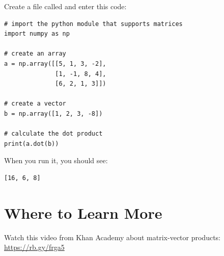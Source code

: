 Create a file called  and enter this code:

\begin{verbatim}
# import the python module that supports matrices
import numpy as np

# create an array
a = np.array([[5, 1, 3, -2], 
              [1, -1, 8, 4], 
              [6, 2, 1, 3]])

# create a vector 
b = np.array([1, 2, 3, -8])

# calculate the dot product
print(a.dot(b))
\end{verbatim}

When you run it, you should see:
\begin{verbatim}
[16, 6, 8]
\end{verbatim}

\section{Where to Learn More}
Watch this video from Khan Academy about matrix-vector products: \url{https://rb.gy/frga5}

